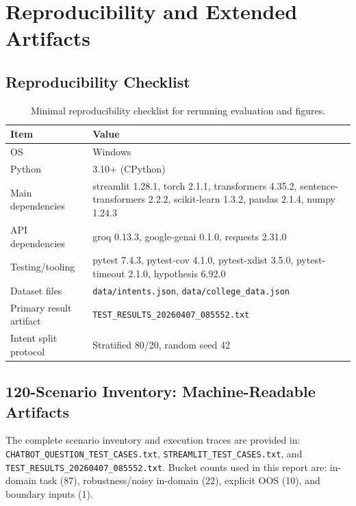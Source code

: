 \documentclass[12pt,onecolumn]{report}
\begin{document}




\newpage
\appendix

\chapter{Reproducibility and Extended Artifacts}

\section{Reproducibility Checklist}
\begin{table}[h]
\centering
\small
\renewcommand{\arraystretch}{1.25}
\setlength{\tabcolsep}{6pt}
\begin{tabular}{p{}p{}}
\toprule
\textbf{Item} & \textbf{Value}\\
\midrule
OS & Windows\\
Python & 3.10+ (CPython)\\
Main dependencies & streamlit 1.28.1, torch 2.1.1, transformers 4.35.2, sentence-transformers 2.2.2, scikit-learn 1.3.2, pandas 2.1.4, numpy 1.24.3\\
API dependencies & groq 0.13.3, google-genai 0.1.0, requests 2.31.0\\
Testing/tooling & pytest 7.4.3, pytest-cov 4.1.0, pytest-xdist 3.5.0, pytest-timeout 2.1.0, hypothesis 6.92.0\\
Dataset files & \texttt{data/intents.json}, \texttt{data/college\_data.json}\\
Primary result artifact & \texttt{TEST\_RESULTS\_20260407\_085552.txt}\\
Intent split protocol & Stratified 80/20, random seed 42\\
\bottomrule
\end{tabular}
\caption{Minimal reproducibility checklist for rerunning evaluation and figures.}
\label{tab:appendix-repro}
\end{table}

\section{120-Scenario Inventory: Machine-Readable Artifacts}
The complete scenario inventory and execution traces are provided in:
\texttt{CHATBOT\_QUESTION\_TEST\_CASES.txt}, \texttt{STREAMLIT\_TEST\_CASES.txt}, and \texttt{TEST\_RESULTS\_20260407\_085552.txt}. Bucket counts used in this report are: in-domain task (87), robustness/noisy in-domain (22), explicit OOS (10), and boundary inputs (1).
\end{document}
